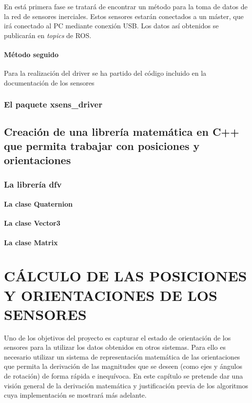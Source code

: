 \documentclass[10pt, a4paper]{report}
\begin{document}
En está primera fase se tratará de encontrar un método para la toma de datos de la red de sensores inerciales. Estos sensores estarán conectados a un máster, que irá conectado al PC mediante conexión USB. Los datos así obtenidos se publicarán en \textit{topics} de ROS.

\subsubsection{Método seguido}

Para la realización del driver se ha partido del código incluido en la documentación de los sensores

\subsection{El paquete xsens\_driver}



\section{Creación de una librería matemática en C++ que permita trabajar con posiciones y orientaciones}


\subsection{La librería dfv}

\subsubsection{La clase Quaternion}

\subsubsection{La clase Vector3}

\subsubsection{La clase Matrix}

\chapter{CÁLCULO DE LAS POSICIONES Y ORIENTACIONES DE LOS SENSORES}

Uno de los objetivos del proyecto es capturar el estado de orientación de los sensores para la utilizar los datos obtenidos en otros sistemas. Para ello es necesario utilizar un sistema de representación matemática de las orientaciones que permita la derivación de las magnitudes que se deseen (como ejes y ángulos de rotación) de forma rápida e inequívoca. En este capítulo se pretende dar una visión general de la derivación matemática y justificación previa de los algoritmos cuya implementación se mostrará más adelante.
\end{document}
